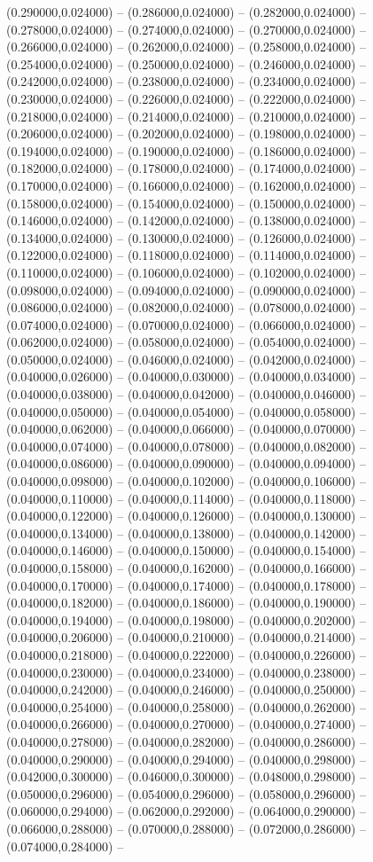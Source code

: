 (0.290000,0.024000) -- (0.286000,0.024000) -- (0.282000,0.024000) -- (0.278000,0.024000) -- (0.274000,0.024000) -- (0.270000,0.024000) -- (0.266000,0.024000) -- (0.262000,0.024000) -- (0.258000,0.024000) -- (0.254000,0.024000) -- (0.250000,0.024000) -- (0.246000,0.024000) -- (0.242000,0.024000) -- (0.238000,0.024000) -- (0.234000,0.024000) -- (0.230000,0.024000) -- (0.226000,0.024000) -- (0.222000,0.024000) -- (0.218000,0.024000) -- (0.214000,0.024000) -- (0.210000,0.024000) -- (0.206000,0.024000) -- (0.202000,0.024000) -- (0.198000,0.024000) -- (0.194000,0.024000) -- (0.190000,0.024000) -- (0.186000,0.024000) -- (0.182000,0.024000) -- (0.178000,0.024000) -- (0.174000,0.024000) -- (0.170000,0.024000) -- (0.166000,0.024000) -- (0.162000,0.024000) -- (0.158000,0.024000) -- (0.154000,0.024000) -- (0.150000,0.024000) -- (0.146000,0.024000) -- (0.142000,0.024000) -- (0.138000,0.024000) -- (0.134000,0.024000) -- (0.130000,0.024000) -- (0.126000,0.024000) -- (0.122000,0.024000) -- (0.118000,0.024000) -- (0.114000,0.024000) -- (0.110000,0.024000) -- (0.106000,0.024000) -- (0.102000,0.024000) -- (0.098000,0.024000) -- (0.094000,0.024000) -- (0.090000,0.024000) -- (0.086000,0.024000) -- (0.082000,0.024000) -- (0.078000,0.024000) -- (0.074000,0.024000) -- (0.070000,0.024000) -- (0.066000,0.024000) -- (0.062000,0.024000) -- (0.058000,0.024000) -- (0.054000,0.024000) -- (0.050000,0.024000) -- (0.046000,0.024000) -- (0.042000,0.024000) -- (0.040000,0.026000) -- (0.040000,0.030000) -- (0.040000,0.034000) -- (0.040000,0.038000) -- (0.040000,0.042000) -- (0.040000,0.046000) -- (0.040000,0.050000) -- (0.040000,0.054000) -- (0.040000,0.058000) -- (0.040000,0.062000) -- (0.040000,0.066000) -- (0.040000,0.070000) -- (0.040000,0.074000) -- (0.040000,0.078000) -- (0.040000,0.082000) -- (0.040000,0.086000) -- (0.040000,0.090000) -- (0.040000,0.094000) -- (0.040000,0.098000) -- (0.040000,0.102000) -- (0.040000,0.106000) -- (0.040000,0.110000) -- (0.040000,0.114000) -- (0.040000,0.118000) -- (0.040000,0.122000) -- (0.040000,0.126000) -- (0.040000,0.130000) -- (0.040000,0.134000) -- (0.040000,0.138000) -- (0.040000,0.142000) -- (0.040000,0.146000) -- (0.040000,0.150000) -- (0.040000,0.154000) -- (0.040000,0.158000) -- (0.040000,0.162000) -- (0.040000,0.166000) -- (0.040000,0.170000) -- (0.040000,0.174000) -- (0.040000,0.178000) -- (0.040000,0.182000) -- (0.040000,0.186000) -- (0.040000,0.190000) -- (0.040000,0.194000) -- (0.040000,0.198000) -- (0.040000,0.202000) -- (0.040000,0.206000) -- (0.040000,0.210000) -- (0.040000,0.214000) -- (0.040000,0.218000) -- (0.040000,0.222000) -- (0.040000,0.226000) -- (0.040000,0.230000) -- (0.040000,0.234000) -- (0.040000,0.238000) -- (0.040000,0.242000) -- (0.040000,0.246000) -- (0.040000,0.250000) -- (0.040000,0.254000) -- (0.040000,0.258000) -- (0.040000,0.262000) -- (0.040000,0.266000) -- (0.040000,0.270000) -- (0.040000,0.274000) -- (0.040000,0.278000) -- (0.040000,0.282000) -- (0.040000,0.286000) -- (0.040000,0.290000) -- (0.040000,0.294000) -- (0.040000,0.298000) -- (0.042000,0.300000) -- (0.046000,0.300000) -- (0.048000,0.298000) -- (0.050000,0.296000) -- (0.054000,0.296000) -- (0.058000,0.296000) -- (0.060000,0.294000) -- (0.062000,0.292000) -- (0.064000,0.290000) -- (0.066000,0.288000) -- (0.070000,0.288000) -- (0.072000,0.286000) -- (0.074000,0.284000) -- 